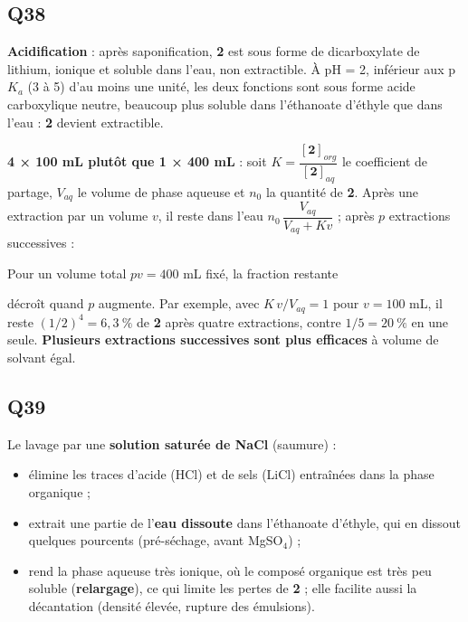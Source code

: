 \documentclass[11pt,a4paper]{article}
\providecommand{\tightlist}{\setlength{\itemsep}{0pt}\setlength{\parskip}{0pt}}
\newcommand{\equationajustee}[1]{%
  \sbox{\boiteequation}{$\displaystyle #1$}%
  \ifdim\wd\boiteequation>\linewidth
    \[\resizebox{\linewidth}{!}{\usebox{\boiteequation}}\]%
  \else
    \[#1\]%
  \fi}
\begin{document}
\hypertarget{q38}{%
\subsection{Q38}\label{q38}}

\textbf{Acidification} : après saponification, \textbf{2} est sous forme de dicarboxylate de lithium, ionique et soluble dans l'eau, non extractible. À pH = 2, inférieur aux p\(K_a\) (3 à 5) d'au moins une unité, les deux fonctions sont sous forme acide carboxylique neutre, beaucoup plus soluble dans l'éthanoate d'éthyle que dans l'eau : \textbf{2} devient extractible.

\textbf{4 × 100 mL plutôt que 1 × 400 mL} : soit \(K=\dfrac{[\mathbf 2]_{org}}{[\mathbf 2]_{aq}}\) le coefficient de partage, \(V_{aq}\) le volume de phase aqueuse et \(n_0\) la quantité de \textbf{2}. Après une extraction par un volume \(v\), il reste dans l'eau \(n_0\,\dfrac{V_{aq}}{V_{aq}+Kv}\) ; après \(p\) extractions successives :

\equationajustee{n_{\mathrm{restant}}=n_0\left(\frac{V_{aq}}{V_{aq}+K\,v}\right)^{p}}

Pour un volume total \(pv=400\) mL fixé, la fraction restante

\equationajustee{\left(1+\frac{K\cdot400}{p\,V_{aq}}\right)^{-p}}

décroît quand \(p\) augmente. Par exemple, avec \(K\,v/V_{aq}=1\) pour \(v=100\) mL, il reste \((1/2)^4=6{,}3\ \%\) de \textbf{2} après quatre extractions, contre \(1/5=20\ \%\) en une seule. \textbf{Plusieurs extractions successives sont plus efficaces} à volume de solvant égal.

\hypertarget{q39}{%
\subsection{Q39}\label{q39}}

Le lavage par une \textbf{solution saturée de NaCl} (saumure) :

\begin{itemize}
\tightlist
\item
  élimine les traces d'acide (HCl) et de sels (LiCl) entraînées dans la phase organique ;
\item
  extrait une partie de l'\textbf{eau dissoute} dans l'éthanoate d'éthyle, qui en dissout quelques pourcents (pré-séchage, avant MgSO\(_4\)) ;
\item
  rend la phase aqueuse très ionique, où le composé organique est très peu soluble (\textbf{relargage}), ce qui limite les pertes de \textbf{2} ; elle facilite aussi la décantation (densité élevée, rupture des émulsions).
\end{itemize}
\end{document}
